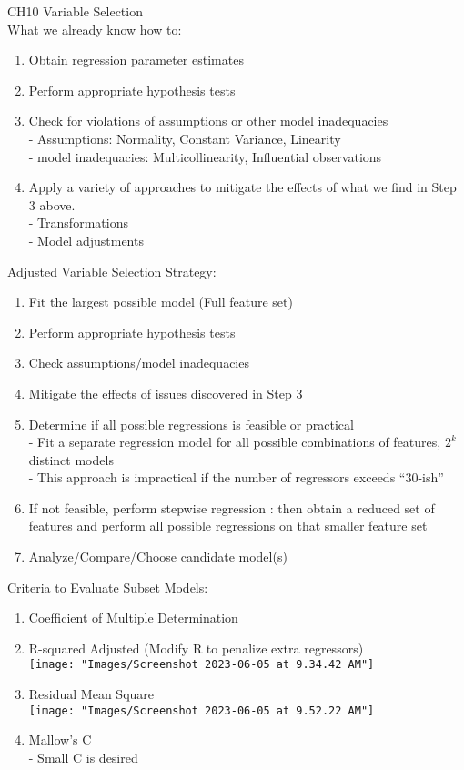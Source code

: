 \documentclass[17pt]{extarticle}%
\begin{document}
\clearpage
{\Large CH10 Variable Selection} \\
%
What we already know how to:
\begin{enumerate}
\item Obtain regression parameter estimates 
\item Perform appropriate hypothesis tests 
\item Check for violations of assumptions or other model inadequacies \\
- Assumptions: Normality, Constant Variance, Linearity \\
- model inadequacies: Multicollinearity, Influential observations
\item Apply a variety of approaches to mitigate the effects of what we find in Step 3 above. \\
- Transformations \\
- Model adjustments
\end{enumerate}
Adjusted Variable Selection Strategy:
\begin{enumerate}
\item Fit the largest possible model (Full feature set)
\item Perform appropriate hypothesis tests
\item Check assumptions/model inadequacies
\item Mitigate the effects of issues discovered in Step 3
\item Determine if all possible regressions is feasible or practical \\
- Fit a separate regression model for all possible combinations of features, $2^k$ distinct models \\
- This approach is impractical if the number of regressors exceeds “30-ish”
\item If not feasible, perform stepwise regression : then obtain a reduced set of features and perform all possible regressions on that smaller feature set
\item Analyze/Compare/Choose candidate model(s)
\end{enumerate}
Criteria to Evaluate Subset Models: \\
\begin{enumerate}
\item Coefficient of Multiple Determination
\item R-squared Adjusted (Modify R to penalize extra regressors) \\
\texttt{[image: "Images/Screenshot 2023-06-05 at 9.34.42 AM"]}
\item Residual Mean Square \\
\texttt{[image: "Images/Screenshot 2023-06-05 at 9.52.22 AM"]} 
\item Mallow's C \\
- Small C is desired
\end{enumerate}
\end{document}
